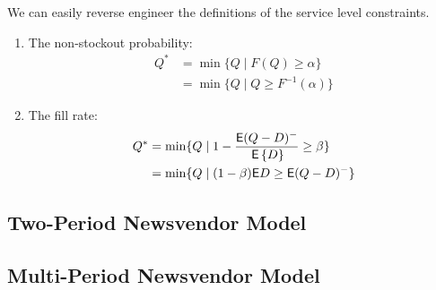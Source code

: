 \begin{solution}
We can easily reverse engineer the definitions of the service level constraints. 

\begin{enumerate}
\item The non-stockout probability:
\begin{align*}
Q^*
& = \min\{Q\mid F(Q) \geq \alpha\} \\
& = \min\{Q\mid Q\geq F^{-1}(\alpha)\}
\end{align*}
\item The fill rate: 
\begin{align*}
Q^*
& =\min\{Q\mid 1-\frac{\mathsf{E}(Q-D)^-}{\,\mathsf{E}\left\{D\right\}} \geq \beta\} \\
& =\min\{Q\mid (1-\beta)\mathsf{E} D \geq \mathsf{E}(Q-D)^-\} 
\end{align*}
\end{enumerate}
\end{solution}
 





\subsection{Two-Period Newsvendor Model}



\subsection{Multi-Period Newsvendor Model}
